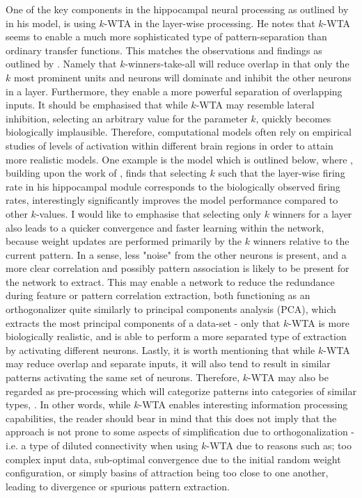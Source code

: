 One of the key components in the hippocampal neural processing as outlined by \cite{Hattori2014} in his model, is using $k$-WTA in the layer-wise processing. He notes that $k$-WTA seems to enable a much more sophisticated type of pattern-separation than ordinary transfer functions. This matches the observations and findings as outlined by \cite{Rolls1998chpt4, Rolls1998chpt6}. Namely that $k$-winners-take-all will reduce overlap in that only the $k$ most prominent units and neurons will dominate and inhibit the other neurons in a layer. Furthermore, they enable a more powerful separation of overlapping inputs. It should be emphasised that while $k$-WTA may resemble lateral inhibition, selecting an arbitrary value for the parameter $k$, quickly becomes biologically implausible. Therefore, computational models often rely on empirical studies of levels of activation within different brain regions in order to attain more realistic models. One example is the model which is outlined below, where \cite{Hattori2014}, building upon the work of \cite{Wakagi2008}, finds that selecting $k$ such that the layer-wise firing rate in his hippocampal module corresponds to the biologically observed firing rates, interestingly significantly improves the model performance compared to other $k$-values. I would like to emphasise that selecting only $k$ winners for a layer also leads to a quicker convergence and faster learning within the network, because weight updates are performed primarily by the $k$ winners relative to the current pattern. In a sense, less "noise" from the other neurons is present, and a more clear correlation and possibly pattern association is likely to be present for the network to extract. This may enable a network to reduce the redundance during feature or pattern correlation extraction, both functioning as an orthogonalizer quite similarly to principal components analysis (PCA), which extracts the most principal components of a data-set - only that $k$-WTA is more biologically realistic, and is able to perform a more separated type of extraction by activating different neurons.
Lastly, it is worth mentioning that while $k$-WTA may reduce overlap and separate inputs, it will also tend to result in similar patterns activating the same set of neurons. Therefore, $k$-WTA may also be regarded as pre-processing which will categorize patterns into categories of similar types, \citep{Rolls1998chpt1}. In other words, while $k$-WTA enables interesting information processing capabilities, the reader should bear in mind that this does not imply that the approach is not prone to some aspects of simplification due to orthogonalization - i.e. a type of diluted connectivity when using $k$-WTA due to reasons such as; too complex input data, sub-optimal convergence due to the initial random weight configuration, or simply basins of attraction being too close to one another, leading to divergence or spurious pattern extraction.

